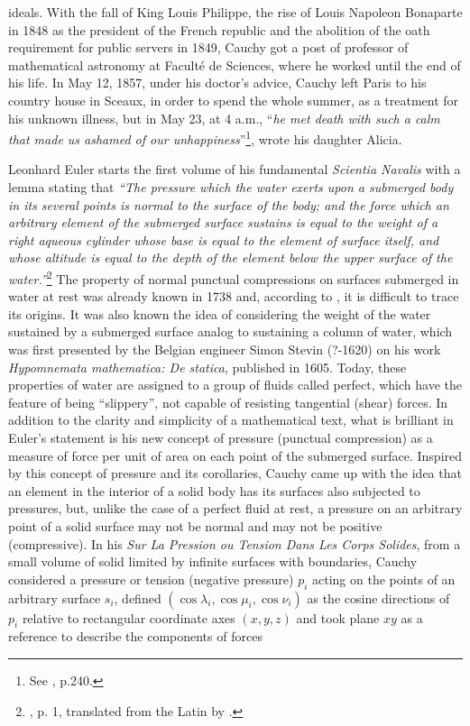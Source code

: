 ideals. With the fall of King Louis Philippe, the rise of Louis Napoleon Bonaparte in 1848 as the president of the French republic and the abolition of the oath requirement for public servers in 1849, Cauchy got a post of professor of mathematical astronomy at Facult\'e de Sciences, where he worked until the end of his life. In May 12, 1857, under his doctor's advice, Cauchy left Paris to his country house in Sceaux, in order to spend the whole summer, as a treatment for his unknown illness, but in May 23, at 4 a.m., ``\emph{he met death with such a calm that made us ashamed of our unhappiness}''\footnote{See \cite{belhoste_1991_1}, p.240.}, wrote his daughter Alicia. 

Leonhard Euler starts the first volume of his fundamental \emph{Scientia Navalis} with a lemma stating that \emph{``The pressure which the water exerts upon a submerged body in its several points is normal to the surface of the body; and the force which an arbitrary element of the submerged surface sustains is equal to the weight of a right aqueous cylinder whose base is equal to the element of surface itself, and whose altitude is equal to the depth of the element below the upper surface of the water.''}\footnote{\cite{euler_1749_1}, p. 1, translated from the Latin by \cite{truesdell_1954_1}.} The property of normal punctual compressions on surfaces submerged in water at rest was already known in 1738 and, according to \cite{truesdell_1954_1}, it is difficult to trace its origins. It was also known the idea of considering the weight of the water sustained by a submerged surface analog to sustaining a column of water, which was first presented by the Belgian engineer Simon Stevin (?-1620) on his work \emph{Hypomnemata mathematica: De statica}, published in 1605. Today, these properties of water are assigned to a group of fluids called perfect, which have the feature of being ``slippery'', not capable of resisting tangential (shear) forces. In addition to the clarity and simplicity of a mathematical text, what is brilliant in Euler's statement is his new concept of pressure (punctual compression) as a measure of force per unit of area on each point of the submerged surface. Inspired by this concept of pressure and its corollaries, Cauchy came up with the idea that an element in the interior of a solid body has its surfaces also subjected to pressures, but, unlike the case of a perfect fluid at rest, a pressure on an arbitrary point of a solid surface may not be normal and may not be positive (compressive).  In his \emph{Sur La Pression ou Tension Dans Les Corps Solides}, from a small volume of solid limited by infinite surfaces with boundaries, Cauchy considered a pressure or tension (negative pressure) $p_i$ acting on the points of an arbitrary surface $s_i$, defined $(\cos\lambda_i,\cos\mu_i,\cos\nu_i)$ as the cosine directions of $p_i$ relative to rectangular coordinate axes $(x,y,z)$ and took plane $xy$ as a reference to describe the components of forces
